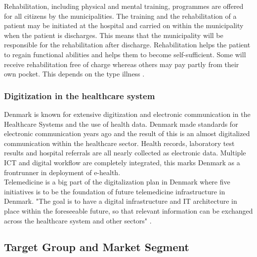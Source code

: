 Rehabilitation, including physical and mental training, programmes are offered for all citizens by the municipalities. The training and the rehabilitation of a patient may be initiated at the hospital and carried on within the municipality when the patient is discharges. This means that the municipality will be responsible for the rehabilitation after discharge. Rehabilitation helps the patient to regain functional abilities and helps them to become self-sufficient. Some will receive rehabilitation free of charge whereas others may pay partly from their own pocket. This depends on the type illness \cite{Healthcareindk2}.



\subsubsection{Digitization in the healthcare system}

Denmark is known for extensive digitization and electronic communication in the Healthcare Systems and the use of health data. Denmark made standards for electronic communication years ago and the result of this is an almost digitalized communication within the healthcare sector. Health records, laboratory test results and hospital referrals are all nearly collected as electronic data. 
Multiple ICT and digital workflow are completely integrated, this marks Denmark as a frontrunner in deployment of e-health.\\
Telemedicine is a big part of the digitalization plan in Denmark where five initiatives is to be the foundation of future telemedicine infrastructure in Denmark. "The goal is to have a digital infrastructure and IT architecture in place within the foreseeable future, so that relevant information can be exchanged across the healthcare system and other sectors" \cite{Healthcareindk2}.






\subsection{Target Group and Market Segment}

